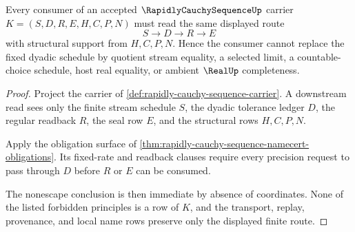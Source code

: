 \begin{theorem}
\label{thm:rapidly-cauchy-sequence-dyadic-schedule-nonescape}
Every consumer of an accepted $\RapidlyCauchySequenceUp$ carrier $K=(S,D,R,E,H,C,P,N)$ must read the same displayed route
$$
S \longrightarrow D \longrightarrow R \longrightarrow E
$$
with structural support from $H,C,P,N$. Hence the consumer cannot replace the fixed dyadic schedule by quotient stream equality, a selected limit, a countable-choice schedule, host real equality, or ambient $\RealUp$ completeness.
\end{theorem}
\begin{proof}
Project the carrier of \autoref{def:rapidly-cauchy-sequence-carrier}. A downstream read sees only the finite stream schedule $S$, the dyadic tolerance ledger $D$, the regular readback $R$, the seal row $E$, and the structural rows $H,C,P,N$.

Apply the obligation surface of \autoref{thm:rapidly-cauchy-sequence-namecert-obligations}. Its fixed-rate and readback clauses require every precision request to pass through $D$ before $R$ or $E$ can be consumed.

The nonescape conclusion is then immediate by absence of coordinates. None of the listed forbidden principles is a row of $K$, and the transport, replay, provenance, and local name rows preserve only the displayed finite route.
\end{proof}



